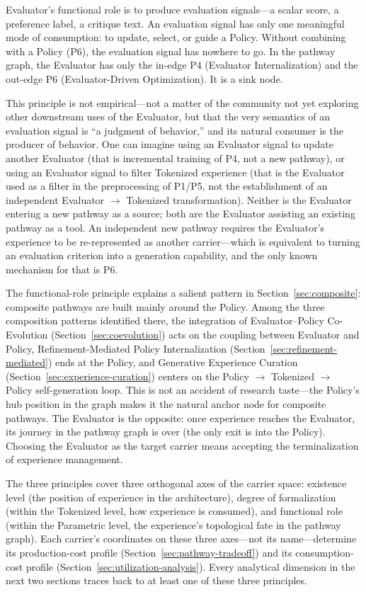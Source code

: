 Evaluator's functional role is to produce evaluation signals---a scalar score, a preference label, a critique text. An evaluation signal has only one meaningful mode of consumption: to update, select, or guide a Policy. Without combining with a Policy (P6), the evaluation signal has nowhere to go. In the pathway graph, the Evaluator has only the in-edge P4 (Evaluator Internalization) and the out-edge P6 (Evaluator-Driven Optimization). It is a sink node.

This principle is not empirical---not a matter of the community not yet exploring other downstream uses of the Evaluator, but that the very semantics of an evaluation signal is ``a judgment of behavior,'' and its natural consumer is the producer of behavior. One can imagine using an Evaluator signal to update another Evaluator (that is incremental training of P4, not a new pathway), or using an Evaluator signal to filter Tokenized experience (that is the Evaluator used as a filter in the preprocessing of P1/P5, not the establishment of an independent Evaluator $\rightarrow$ Tokenized transformation). Neither is the Evaluator entering a new pathway as a source; both are the Evaluator assisting an existing pathway as a tool. An independent new pathway requires the Evaluator's experience to be re-represented as another carrier---which is equivalent to turning an evaluation criterion into a generation capability, and the only known mechanism for that is P6.

The functional-role principle explains a salient pattern in Section~\ref{sec:composite}: composite pathways are built mainly around the Policy. Among the three composition patterns identified there, the integration of Evaluator--Policy Co-Evolution (Section~\ref{sec:coevolution}) acts on the coupling between Evaluator and Policy, Refinement-Mediated Policy Internalization (Section~\ref{sec:refinement-mediated}) ends at the Policy, and Generative Experience Curation (Section~\ref{sec:experience-curation}) centers on the Policy $\rightarrow$ Tokenized $\rightarrow$ Policy self-generation loop. This is not an accident of research taste---the Policy's hub position in the graph makes it the natural anchor node for composite pathways. The Evaluator is the opposite: once experience reaches the Evaluator, its journey in the pathway graph is over (the only exit is into the Policy). Choosing the Evaluator as the target carrier means accepting the terminalization of experience management.

The three principles cover three orthogonal axes of the carrier space: existence level (the position of experience in the architecture), degree of formalization (within the Tokenized level, how experience is consumed), and functional role (within the Parametric level, the experience's topological fate in the pathway graph). Each carrier's coordinates on these three axes---not its name---determine its production-cost profile (Section~\ref{sec:pathway-tradeoff}) and its consumption-cost profile (Section~\ref{sec:utilization-analysis}). Every analytical dimension in the next two sections traces back to at least one of these three principles.

